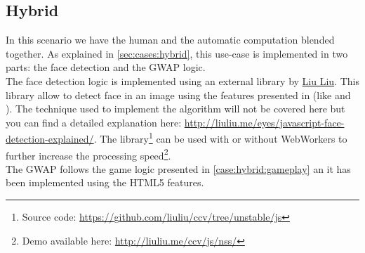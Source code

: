 \subsection{Hybrid}
In this scenario we have the human and the automatic computation blended together.
As explained in \ref{sec:cases:hybrid}, this use-case is implemented in two
parts: the face detection and the \ac{GWAP} logic.\\

The face detection logic is implemented using an external library by
\href{http://liuliu.me/}{Liu Liu}. This library allow to detect face in an image
using the \js{} features presented in (like  and ).
The technique used to implement the algorithm will not be covered here but you
can find a detailed explanation here:
\url{http://liuliu.me/eyes/javascript-face-detection-explained/}.
The library\footnote{Source code: \url{https://github.com/liuliu/ccv/tree/unstable/js}}
can be used with or without WebWorkers to further increase the processing
speed\footnote{Demo available here: \url{http://liuliu.me/ccv/js/nss/}}.\\

The \ac{GWAP} follows the game logic presented in \ref{case:hybrid:gameplay} an
it has been implemented using the \ac{HTML}5 features.